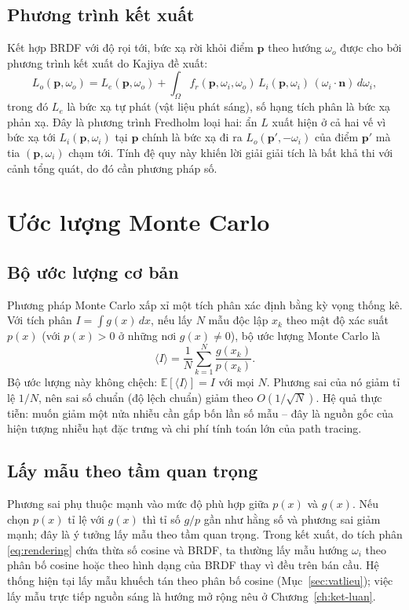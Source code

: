 \subsection{Phương trình kết xuất}
Kết hợp BRDF với độ rọi tới, bức xạ rời khỏi điểm $\mathbf{p}$ theo hướng
$\omega_o$ được cho bởi phương trình kết xuất do Kajiya đề
xuất:
\begin{equation}
\label{eq:rendering}
L_o(\mathbf{p}, \omega_o) = L_e(\mathbf{p}, \omega_o)
  + \int_{\Omega} f_r(\mathbf{p}, \omega_i, \omega_o)\,
    L_i(\mathbf{p}, \omega_i)\, (\omega_i \cdot \mathbf{n})\, d\omega_i,
\end{equation}
trong đó $L_e$ là bức xạ tự phát (vật liệu phát sáng), số hạng tích phân là bức
xạ phản xạ. Đây là phương trình Fredholm loại hai: ẩn $L$ xuất hiện ở cả
hai vế vì bức xạ tới $L_i(\mathbf{p},\omega_i)$ tại $\mathbf{p}$ chính là bức xạ
đi ra $L_o(\mathbf{p}', -\omega_i)$ của điểm $\mathbf{p}'$ mà tia $(\mathbf{p},
\omega_i)$ chạm tới. Tính đệ quy này khiến lời giải giải tích là bất khả thi với
cảnh tổng quát, do đó cần phương pháp số.

\section{Ước lượng Monte Carlo}

\subsection{Bộ ước lượng cơ bản}
Phương pháp Monte Carlo xấp xỉ một tích phân xác định bằng kỳ vọng thống kê. Với
tích phân $I = \int g(x)\, dx$, nếu lấy $N$ mẫu độc lập $x_k$ theo mật độ xác
suất $p(x)$ (với $p(x)>0$ ở những nơi $g(x)\neq0$), bộ ước lượng Monte
Carlo là
\begin{equation}
\label{eq:montecarlo}
\langle I \rangle = \frac{1}{N}\sum_{k=1}^{N} \frac{g(x_k)}{p(x_k)} .
\end{equation}
Bộ ước lượng này không chệch: $\mathbb{E}[\langle I\rangle]=I$
với mọi $N$. Phương sai của nó giảm tỉ lệ $1/N$, nên sai số chuẩn (độ lệch
chuẩn) giảm theo $O(1/\sqrt{N})$. Hệ quả thực tiễn: muốn giảm một nửa nhiễu cần
gấp bốn lần số mẫu -- đây là nguồn gốc của hiện tượng nhiễu hạt
đặc trưng và chi phí tính toán lớn của path tracing.

\subsection{Lấy mẫu theo tầm quan trọng}
Phương sai phụ thuộc mạnh vào mức độ phù hợp giữa $p(x)$ và $g(x)$. Nếu chọn
$p(x)$ tỉ lệ với $g(x)$ thì tỉ số $g/p$ gần như hằng số và phương sai giảm mạnh;
đây là ý tưởng lấy mẫu theo tầm quan trọng. Trong kết xuất, do tích phân
\eqref{eq:rendering} chứa thừa số cosine và BRDF, ta thường lấy mẫu hướng
$\omega_i$ theo phân bố cosine hoặc theo hình dạng của BRDF thay vì đều trên bán
cầu. Hệ thống hiện tại lấy mẫu khuếch tán theo phân bố cosine (Mục~\ref{sec:vatlieu});
việc lấy mẫu trực tiếp nguồn sáng là hướng mở rộng nêu ở
Chương~\ref{ch:ket-luan}.

